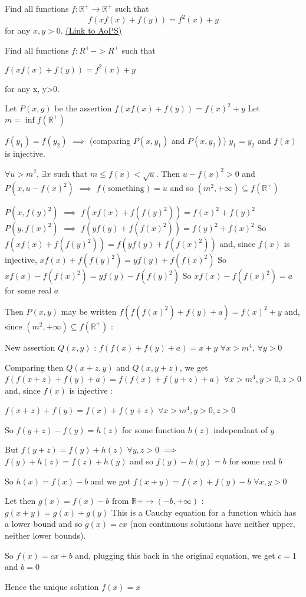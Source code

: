 \begin{problem}
	Find all functions $f: \mathbb R^{+} \to \mathbb R^{+}$ such that
\[f(xf(x) + f(y)) = f^2(x) + y\]
for any $x, y>0$.
	\flushright \href{https://artofproblemsolving.com/community/c6h307855}{(Link to AoPS)}
\end{problem}



\begin{solution}
	\begin{tcolorbox}Find all functions $ f: R^ + - > R^ +$ such that

$ f(xf(x) + f(y)) = f^2(x) + y$

for any x, y>0.\end{tcolorbox}
Let $ P(x,y)$ be the assertion $ f(xf(x)+f(y))=f(x)^2+y$
Let $ m=\inf f(\mathbb R^+)$

$ f(y_1)=f(y_2)$ $ \implies$ (comparing $ P(x,y_1)$ and $ P(x,y_2)$) $ y_1=y_2$ and $ f(x)$ is injective.

$ \forall u>m^2$, $ \exists x$ such that $ m\leq f(x)<\sqrt u$. Then $ u-f(x)^2>0$ and $ P(x,u-f(x)^2)$ $ \implies$ $ f(\text{something})=u$ and so $ (m^2,+\infty)\subseteq f(\mathbb R^+)$

$ P(x,f(y)^2)$ $ \implies$ $ f(xf(x)+f(f(y)^2))=f(x)^2+f(y)^2$
$ P(y,f(x)^2)$ $ \implies$ $ f(yf(y)+f(f(x)^2))=f(y)^2+f(x)^2$
So $ f(xf(x)+f(f(y)^2))=f(yf(y)+f(f(x)^2))$ and, since $ f(x)$ is injective, $ xf(x)+f(f(y)^2)=yf(y)+f(f(x)^2)$
So $ xf(x)-f(f(x)^2)=yf(y)-f(f(y)^2)$
So $ xf(x)-f(f(x)^2)=a$ for some real $ a$

Then $ P(x,y)$ may be written $ f(f(f(x)^2)+f(y)+a)=f(x)^2+y$ and, since $ (m^2,+\infty)\subseteq f(\mathbb R^+)$ :

New assertion $ Q(x,y)$ : $ f(f(x)+f(y)+a)=x+y$ $ \forall x>m^4$,  $ \forall y>0$

Comparing then $ Q(x+z,y)$ and $ Q(x,y+z)$, we get $ f(f(x+z)+f(y)+a)=f(f(x)+f(y+z)+a)$ $ \forall x>m^4,y>0,z>0$ and, since $ f(x)$ is injective :

$ f(x+z)+f(y)=f(x)+f(y+z)$ $ \forall x>m^4,y>0,z>0$

So $ f(y+z)-f(y)=h(z)$ for some function $ h(z)$ independant of $ y$

But $ f(y+z)=f(y)+h(z)$ $ \forall y,z>0$ $ \implies$ $ f(y)+h(z)=f(z)+h(y)$ and so $ f(y)-h(y)=b$ for some real $ b$

So $ h(x)=f(x)-b$ and we got $ f(x+y)=f(x)+f(y)-b$ $ \forall x,y>0$

Let then $ g(x)=f(x)-b$ from $ \mathbb R+\to(-b,+\infty)$ : $ g(x+y)=g(x)+g(y)$
This is a Cauchy equation for a function which has a lower bound and so $ g(x)=cx$ (non continuous solutions have neither upper, neither lower bounds).

So $ f(x)=cx+b$ and, plugging this back in the original equation, we get $ c=1$ and $ b=0$

Hence the unique solution $ \boxed{f(x)=x}$
\end{solution}
